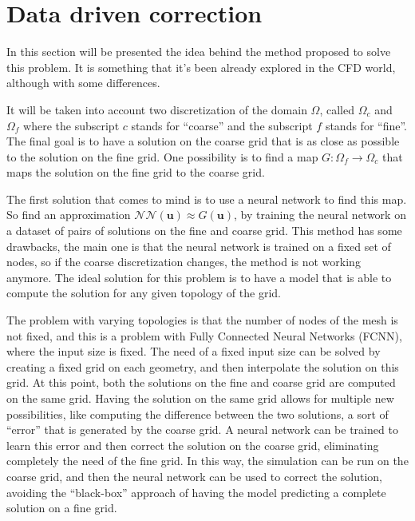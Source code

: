 \section{Data driven correction}
\label{sec:neural_network}

In this section will be presented the idea behind the method proposed to solve this problem. It is something that it's been already explored in the CFD world, although with some differences. 

It will be taken into account two discretization of the domain \(\Omega\), called \(\Omega_c\) and \(\Omega_f\) where the subscript \(c\) stands for ``coarse'' and the subscript \(f\) stands for ``fine''. The final goal is to have a solution on the coarse grid that is as close as possible to the solution on the fine grid. One possibility is to find a map \(G: \Omega_f \rightarrow \Omega_c\) that maps the solution on the fine grid to the coarse grid. 

The first solution that comes to mind is to use a neural network to find this map. So find an approximation \(\mathcal{NN}(\bm{u}) \approx G(\bm{u})\), by training the neural network on a dataset of pairs of solutions on the fine and coarse grid. This method has some drawbacks, the main one is that the neural network is trained on a fixed set of nodes, so if the coarse discretization changes, the method is not working anymore. The ideal solution for this problem is to have a model that is able to compute the solution for any given topology of the grid.

The problem with varying topologies is that the number of nodes of the mesh is not fixed, and this is a problem with Fully Connected Neural Networks (FCNN), where the input size is fixed. The need of a fixed input size can be solved by creating a fixed grid on each geometry, and then interpolate the solution on this grid. At this point, both the solutions on the fine and coarse grid are computed on the same grid. Having the solution on the same grid allows for multiple new possibilities, like computing the difference between the two solutions, a sort of ``error'' that is generated by the coarse grid. A neural network can be trained to learn this error and then correct the solution on the coarse grid, eliminating completely the need of the fine grid. In this way, the simulation can be run on the coarse grid, and then the neural network can be used to correct the solution, avoiding the ``black-box'' approach of having the model predicting a complete solution on a fine grid. 
